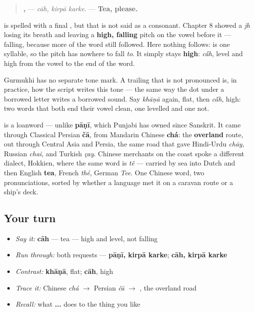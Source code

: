 \begin{quote}
\textbf{,  } — \emph{cāh, kirpā karke.} — \textbf{Tea, please.}
\end{quote}

\begin{sounds}
\textbf{} is spelled with a final \textbf{}, but that \textbf{} is not said as a consonant. Chapter 8 showed a \emph{jh} losing its breath and leaving a \textbf{high, falling} pitch on the vowel before it — falling, because more of the word still followed. Here nothing follows: \textbf{} is one syllable, so the pitch has nowhere to fall \emph{to}. It simply stays \textbf{high}: \emph{c\'{\={a}}h}, level and high from the vowel to the end of the word.

Gurmukhi has no separate tone mark. A trailing \textbf{} that is not pronounced is, in practice, how the script writes this tone — the same way the dot under a borrowed letter writes a borrowed sound. Say \textbf{} \emph{khāṇā} again, flat, then \textbf{} \emph{c\'{\={a}}h}, high: two words that both end their vowel clean, one levelled and one not.
\end{sounds}

\begin{cousinweb}
\textbf{} is a loanword — unlike \textbf{pāṇī}, which Punjabi has owned since Sanskrit. It came through Classical Persian \textbf{čā}, from Mandarin Chinese \textbf{chá}: the \textbf{overland} route, out through Central Asia and Persia, the same road that gave Hindi-Urdu \emph{chāy}, Russian \emph{chai}, and Turkish \emph{çay}. Chinese merchants on the coast spoke a different dialect, Hokkien, where the same word is \emph{tê} — carried by sea into Dutch and then English \textbf{tea}, French \emph{thé}, German \emph{Tee}. One Chinese word, two pronunciations, sorted by whether a language met it on a caravan route or a ship's deck.
\end{cousinweb}

\subsection*{Your turn}
\begin{itemize}
\raggedright
  \item \emph{Say it:} \textbf{cāh} — tea — high and level, not falling
  \item \emph{Run through:} both requests — \textbf{pāṇī, kirpā karke}; \textbf{cāh, kirpā karke}
  \item \emph{Contrast:} \textbf{khāṇā}, flat; \textbf{cāh}, high
  \item \emph{Trace it:} Chinese \emph{chá} $\to$ Persian \emph{čā} $\to$ \textbf{}, the overland road
  \item \emph{Recall:} what \textbf{ ...  } does to the thing you like
\end{itemize}

